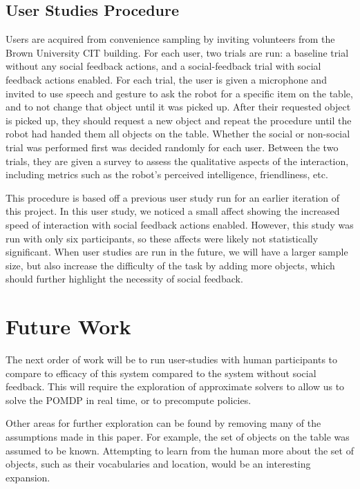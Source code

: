 \documentclass{article}
\begin{document}
\begin{multicols}{2}
\subsection{User Studies Procedure}

Users are acquired from convenience sampling by inviting volunteers from the Brown University CIT building. For each user, two trials are run: a baseline trial without any social feedback actions, and a social-feedback trial with social feedback actions enabled. For each trial, the user is given a microphone and invited to use speech and gesture to ask the robot for a specific item on the table, and to not change that object until it was picked up. After their requested object is picked up, they should request a new object and repeat the procedure until the robot had handed them all objects on the table. Whether the social or non-social trial was performed first was decided randomly for each user. Between the two trials, they are given a survey to assess the qualitative aspects of the interaction, including metrics such as the robot's perceived intelligence, friendliness, etc. 

This procedure is based off a previous user study run for an earlier iteration of this project. In this user study, we noticed a small affect showing the increased speed of interaction with social feedback actions enabled. However, this study was run with only six participants, so these affects were likely not statistically significant. When user studies are run in the future, we will have a larger sample size, but also increase the difficulty of the task by adding more objects, which should further highlight the necessity of social feedback. 


\section{Future Work}

The next order of work will be to run user-studies with human participants to compare to efficacy of this system compared to the system without social feedback. This will require the exploration of approximate solvers to allow us to solve the POMDP in real time, or to precompute policies. 

Other areas for further exploration can be found by removing many of the assumptions made in this paper. For example, the set of objects on the table was assumed to be known. Attempting to learn from the human more about the set of objects, such as their vocabularies and location, would be an interesting expansion. 


\end{multicols}
\end{document}
